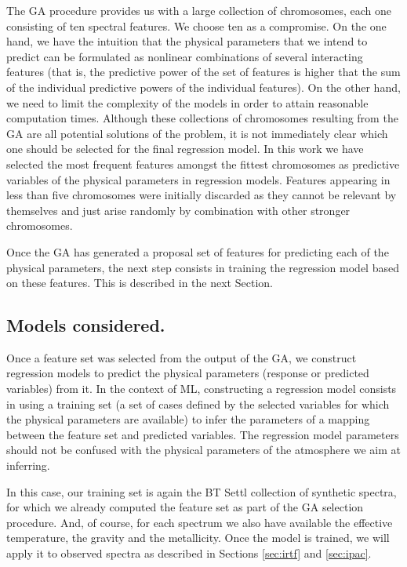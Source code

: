 The GA procedure provides us with a large collection of chromosomes,
each one consisting of ten spectral features. We choose ten as a
compromise. On the one hand, we have the intuition that the physical
parameters that we intend to predict can be formulated as nonlinear
combinations of several interacting features (that is, the predictive
power of the set of features is higher that the sum of the individual
predictive powers of the individual features). On the other hand, we
need to limit the complexity of the models in order to attain
reasonable computation times. Although these collections of
chromosomes resulting from the GA are all potential solutions of the
problem, it is not immediately clear which one should be selected for
the final regression model. In this work we have selected the most
frequent features amongst the fittest chromosomes as predictive
variables of the physical parameters in regression models. Features
appearing in less than five chromosomes were initially discarded as
they cannot be relevant by themselves and just arise randomly by
combination with other stronger chromosomes.

Once the GA has generated a proposal set of features for predicting
each of the physical parameters, the next step consists in training
the regression model based on these features. This is described in the
next Section.

\subsection{Models considered.}
\label {ssub:models}

Once a feature set was selected from the
output of the GA, we construct regression models to predict the
physical parameters (response or predicted variables) from it. In the
context of ML, constructing a regression model consists
in using a training set (a set of cases defined by the selected 
variables for which the physical parameters are available) to infer
the parameters of a mapping between 
the feature set and predicted variables. 
The regression model parameters should not be
confused with the physical parameters of the atmosphere we aim at
inferring. 

In this case, our training set is again the BT Settl collection of
synthetic spectra, for which we already computed the 
feature set as part of the GA selection procedure. And,
of course, for each spectrum we also have available the effective
temperature, the gravity and the metallicity. Once the model is
trained, we will apply it to observed spectra as described in
Sections \ref{sec:irtf} and \ref{sec:ipac}.  

